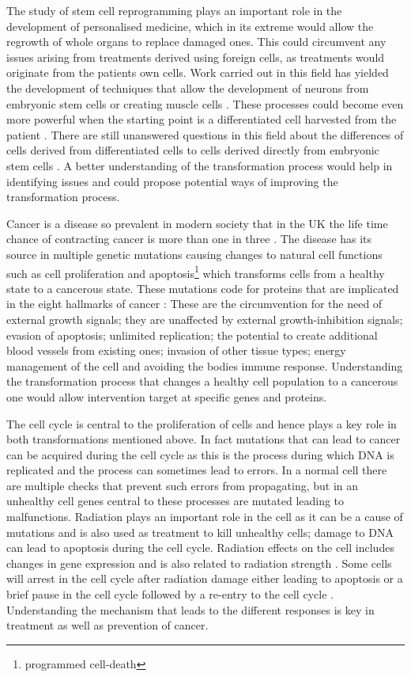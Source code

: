 The study of stem cell reprogramming plays an important role in the development of personalised medicine, which in its extreme would allow the regrowth of whole organs to replace damaged ones. This could circumvent any issues arising from treatments derived using foreign cells, as treatments would originate from the patients own cells. Work carried out in this field has yielded the development of techniques that allow the development of neurons from embryonic stem cells \citep{Vierbuchen:2010fa, Pang:2011ce} or creating muscle cells \citep{Ieda:2010ir, Efe:2011bpa}. These processes could become even more powerful when the starting point is a differentiated cell harvested from the patient \citep{Takahashi:2006hi}. There are still unanswered questions in this field about the differences of cells derived from differentiated cells to cells derived directly from embryonic stem cells \citep{Carey:2011bs, Bock:2011kx}. A better understanding of the transformation process would help in identifying issues and could propose potential ways of improving the transformation process.

Cancer is a disease so prevalent in modern society that in the UK the life time chance of contracting cancer is more than one in three \citep{Sasieni:2011}. The disease has its source in multiple genetic mutations causing changes to natural cell functions such as cell proliferation and apoptosis\footnote{programmed cell-death} which transforms cells from a healthy state to a cancerous state. These mutations code for proteins that are implicated in the eight hallmarks of cancer \citep{Hanahan:2011gu}: These are the circumvention for the need of external growth signals; they are unaffected by external growth-inhibition signals; evasion of apoptosis; unlimited replication; the potential to create additional blood vessels from existing ones; invasion of other tissue types; energy management of the cell and avoiding the bodies immune response. Understanding the transformation process that changes a healthy cell population to a cancerous one would allow intervention target at specific genes and proteins.

The cell cycle is central to the proliferation of cells and hence plays a key role in both transformations mentioned above. In fact mutations that can lead to cancer can be acquired during the cell cycle as this is the process during which DNA is replicated and the process can sometimes lead to errors. In a normal cell there are multiple checks that prevent such errors from propagating, but in an unhealthy cell genes central to these processes are mutated leading to malfunctions. Radiation plays an important role in the cell as it can be a cause of mutations and is also used as treatment to kill unhealthy cells; damage to DNA can lead to apoptosis during the cell cycle. Radiation effects on the cell includes changes in gene expression and is also related to radiation strength \citep{Gentile:2003in}. Some cells will arrest in the cell cycle after radiation damage either leading to apoptosis or a brief pause in the cell cycle followed by a re-entry to the cell cycle \citep{Pawlik2004928}. Understanding the mechanism that leads to the different responses is key in treatment as well as prevention of cancer.

